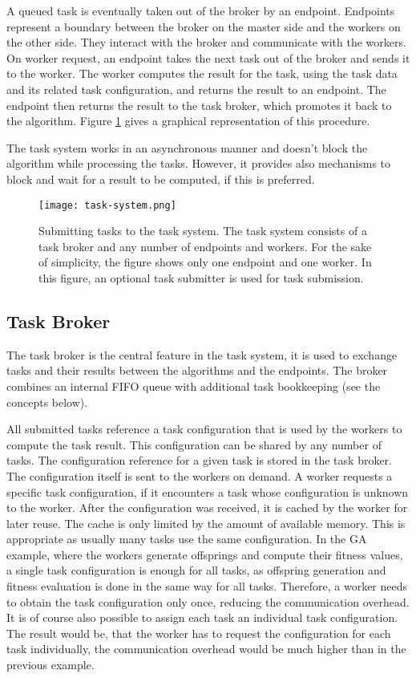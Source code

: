 A queued task is eventually taken out of the broker by an endpoint. Endpoints represent a boundary between the broker on the master side and the workers on the other side. They interact with the broker and communicate with the workers. On worker request, an endpoint takes the next task out of the broker and sends it to the worker. The worker computes the result for the task, using the task data and its related task configuration, and returns the result to an endpoint. The endpoint then returns the result to the task broker, which promotes it back to the algorithm. Figure \ref{fig:task-system} gives a graphical representation of this procedure.

The task system works in an asynchronous manner and doesn't block the algorithm while processing the tasks. However, it provides also mechanisms to block and wait for a result to be computed, if this is preferred.

\begin{figure}[ht!]
  \centering
  \texttt{[image: task-system.png]}
  \caption{Submitting tasks to the task system. The task system consists of a task broker and any number of endpoints and workers. For the sake of simplicity, the figure shows only one endpoint and one worker. In this figure, an optional task submitter is used for task submission.}
  \label{fig:task-system}
\end{figure}

\subsection{Task Broker}
The task broker is the central feature in the task system, it is used to exchange tasks and their results between the algorithms and the endpoints. The broker combines an internal FIFO queue with additional task bookkeeping (see the concepts below).

All submitted tasks reference a task configuration that is used by the workers to compute the task result. This configuration can be shared by any number of tasks. The configuration reference for a given task is stored in the task broker. The configuration itself is sent to the workers on demand. A worker requests a specific task configuration, if it encounters a task whose configuration is unknown to the worker. After the configuration was received, it is cached by the worker for later reuse. The cache is only limited by the amount of available memory. This is appropriate as usually many tasks use the same configuration. In the GA example, where the workers generate offsprings and compute their fitness values, a single task configuration is enough for all tasks, as offspring generation and fitness evaluation is done in the same way for all tasks. Therefore, a worker needs to obtain the task configuration only once, reducing the communication overhead. It is of course also possible to assign each task an individual task configuration. The result would be, that the worker has to request the configuration for each task individually, the communication overhead would be much higher than in the previous example.

